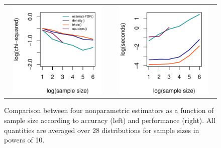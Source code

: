 \begin{figure}[tbp]
\centering
\begin{tabular}{p{} p{}}
  \vspace{0pt} \includegraphics[width=2.2in, height=1.85in]{Figure7a.pdf} &
  \vspace{0pt} \includegraphics[width=2.2in, height=1.85in]{Figure7b.pdf} 
\end{tabular}
\caption{\label{fig:compareDistributions1} Comparison between four nonparametric estimators as a function of sample size according to accuracy (left) and performance (right). All quantities are averaged over 28 distributions for sample sizes in powers of 10.} 
\end{figure}

